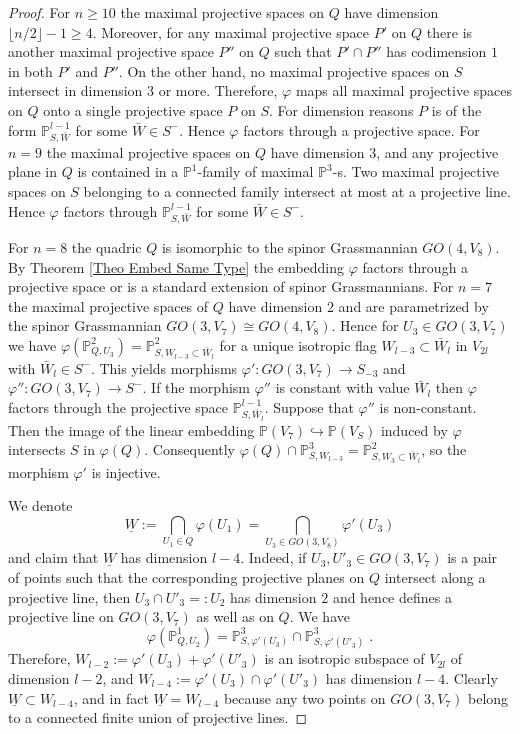 \documentclass[12pt]{amsart}
\def\PP {{\mathbb P}}     %
\def\hw  {\hookrightarrow}
\def\ul  {\underline}
\begin{document}
\begin{proof}
For $n\geq 10$ the maximal projective spaces on $Q$ have dimension $\lfloor n/2\rfloor-1 \geq 4$. Moreover, for any maximal projective space $P'$ on $Q$ there is another maximal projective space $P''$ on $Q$ such that $P'\cap P''$ has codimension $1$ in both $P'$ and $P''$. On the other hand, no maximal projective spaces on $S$ intersect in dimension 3 or more. Therefore, $\varphi$ maps all maximal projective spaces on $Q$ onto a single projective space $P$ on $S$. For dimension reasons $P$ is of the form $\PP^{l-1}_{S,\bar W}$ for some $\bar W\in S^{-}$. Hence $\varphi$ factors through a projective space. For $n=9$ the maximal projective spaces on $Q$ have dimension $3$, and any projective plane in $Q$ is contained in a $\PP^1$-family of maximal $\PP^3$-s. Two maximal projective spaces on $S$ belonging to a connected family intersect at most at a projective line. Hence $\varphi$ factors through $\PP^{l-1}_{S,\bar W}$ for some $\bar W\in S^{-}$. 

For $n=8$ the quadric $Q$ is isomorphic to the spinor Grassmannian $GO(4,V_8)$. By Theorem \ref{Theo Embed Same Type} the embedding $\varphi$ factors through a projective space or is a standard extension of spinor Grassmannians. For $n=7$ the maximal projective spaces of $Q$ have dimension $2$ and are parametrized by the spinor Grassmannian $GO(3,V_7)\cong GO(4,V_8)$. Hence for $U_3\in GO(3,V_7)$ we have $\varphi(\PP^2_{Q,U_3})=\PP^{2}_{S,W_{l-3}\subset\bar W_l}$ for a unique isotropic flag $W_{l-3}\subset \bar W_l$ in $V_{2l}$ with $\bar W_l\in S^{-}$. This yields morphisms $\varphi':GO(3,V_7)\to S_{-3}$ and $\varphi'':GO(3,V_7)\to S^{-}$. If the morphism $\varphi''$ is constant with value $\bar W_l$ then $\varphi$ factors through the projective space $\PP^{l-1}_{S,\bar W_l}$. Suppose that $\varphi''$ is non-constant. Then the image of the linear embedding $\PP(V_7)\hw \PP(V_S)$ induced by $\varphi$ intersects $S$ in $\varphi(Q)$. Consequently $\varphi(Q)\cap \PP^3_{S,W_{l-3}}=\PP^{2}_{S,W_3\subset\bar W_l}$, so the morphism $\varphi'$ is injective.

We denote
$$
\ul{W}:=\bigcap\limits_{U_1\in Q} \varphi(U_1)= \bigcap\limits_{U_3\in GO(3,V_8)} \varphi'(U_3)
$$
and claim that $\ul{W}$ has dimension $l-4$. Indeed, if $U_3,U'_3\in GO(3,V_7)$ is a pair of points such that the corresponding projective planes on $Q$ intersect along a projective line, then $U_3\cap U'_3=:U_2$ has dimension $2$ and hence defines a projective line on $GO(3,V_7)$ as well as on $Q$. We have
$$
\varphi(\PP^1_{Q,U_2}) = \PP^3_{S,\varphi'(U_3)} \cap \PP^3_{S,\varphi'(U'_3)} \;.
$$
Therefore, $W_{l-2} := \varphi'(U_3)+ \varphi'(U'_3)$ is an isotropic subspace of $V_{2l}$ of dimension $l-2$, and $W_{l-4} := \varphi'(U_3)\cap \varphi'(U'_3)$ has dimension $l-4$. Clearly $\ul{W}\subset W_{l-4}$, and in fact $\ul{W}=W_{l-4}$ because any two points on $GO(3,V_7)$ belong to a connected finite union of projective lines.


\end{proof}
\end{document}
